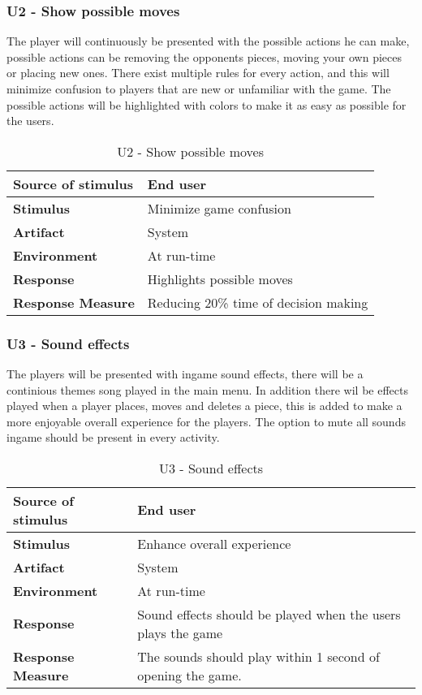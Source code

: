 \pagebreak

\subsubsection{U2 - Show possible moves}

The player will continuously be presented with the possible actions he can make, possible actions can be removing the opponents pieces, moving your own pieces or placing new ones. There exist multiple rules for every action, and this will minimize confusion to players that are new or unfamiliar with the game. The possible actions will be highlighted with colors to make it as easy as possible for the users.

\begin{table}[h!]
\begin{tabular}{ | p{110pt} | p{250pt}  |}
\hline
\bf Source of stimulus &  End user  \\ \hline
\bf Stimulus & Minimize game confusion \\ \hline 
\bf Artifact & System  \\  \hline
\bf Environment & At run-time \\ \hline
\bf Response & Highlights possible moves \\ \hline
\bf Response Measure & Reducing 20\% time of decision making   \\ \hline
\end{tabular}
\caption{U2 - Show possible moves}
\end{table}

\subsubsection{U3 - Sound effects}

The players will be presented with ingame sound effects, there will be a continious themes song played in the main menu. In addition there wil be effects played when a player places, moves and deletes a piece, this is added to make a more enjoyable overall experience for the players. The option to mute all sounds ingame should be present in every activity.

\begin{table}[h!]
\begin{tabular}{ | p{110pt} | p{250pt}  |}
\hline
\bf Source of stimulus &  End user  \\ \hline
\bf Stimulus & Enhance overall experience \\ \hline 
\bf Artifact & System  \\  \hline
\bf Environment & At run-time \\ \hline
\bf Response & Sound effects should be played when the users plays the game \\ \hline
\bf Response Measure &  The sounds should play within 1 second of opening the game. \\ \hline

\end{tabular}
\caption{U3 - Sound effects}
\end{table}

